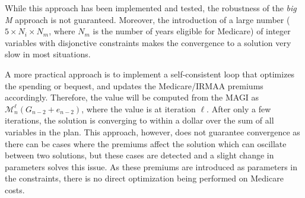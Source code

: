 \documentclass{report}[fleqn,12pt]
\begin{document}
\begin{description}[leftmargin=4em,style=multiline]
	While this approach has been implemented and tested, the robustness of the {\em big M} approach
	is not guaranteed. Moreover, the introduction of a large number ($5\times N_i\times N_m$,
        where $N_m$ is the number of years eligible for Medicare) of integer variables with
        disjonctive constraints makes the
	convergence to a solution very slow in most situations.

        A more practical approach is to implement a self-consistent loop that
	optimizes the spending or bequest, and updates the Medicare/IRMAA premiums accordingly.
	Therefore, the value will be computed from the MAGI
	as $\mathcal{M}_n^\ell(G_{n-2} + e_{n-2})$, where the value is at iteration $\ell$.
	After only a few iterations, the solution is converging to within a dollar over the
	sum of all variables in the plan. This approach, however, does not guarantee convergence
	as there can be cases where the premiums affect the solution which can oscillate between
	two solutions, but these cases are detected and a slight change in parameters
	solves this issue. As these premiums are introduced as parameters in the constraints,
	there is no direct optimization being performed on Medicare costs.
\end{description}
\end{document}
